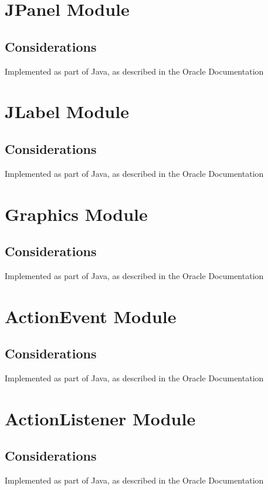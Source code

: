 \documentclass{article}
\begin{document}
\section*{JPanel Module}

	\subsection*{Considerations}
		Implemented as part of Java, as described in the Oracle Documentation

\section*{JLabel Module}

	\subsection*{Considerations}
		Implemented as part of Java, as described in the Oracle Documentation

\section*{Graphics Module}

	\subsection*{Considerations}
		Implemented as part of Java, as described in the Oracle Documentation

\section*{ActionEvent Module}

	\subsection*{Considerations}
		Implemented as part of Java, as described in the Oracle Documentation

\section*{ActionListener Module}

	\subsection*{Considerations}
		Implemented as part of Java, as described in the Oracle Documentation
\end{document}
